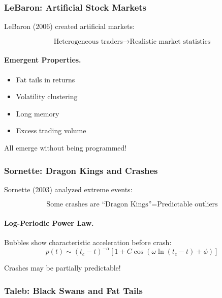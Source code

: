 \subsubsection{LeBaron: Artificial Stock Markets}

LeBaron (2006) created artificial markets:

\begin{equation}
\text{Heterogeneous traders} \to \text{Realistic market statistics}
\end{equation}

\paragraph{Emergent Properties.}
\begin{itemize}
    \item Fat tails in returns
    \item Volatility clustering
    \item Long memory
    \item Excess trading volume
\end{itemize}

All emerge without being programmed!

\subsubsection{Sornette: Dragon Kings and Crashes}

Sornette (2003) analyzed extreme events:

\begin{equation}
\boxed{
\text{Some crashes are ``Dragon Kings''} = \text{Predictable outliers}
}
\label{eq:sornette}
\end{equation}

\paragraph{Log-Periodic Power Law.}
Bubbles show characteristic acceleration before crash:
\begin{equation}
p(t) \sim (t_c - t)^{-\alpha} [1 + C \cos(\omega \ln(t_c - t) + \phi)]
\end{equation}

Crashes may be partially predictable!

\subsubsection{Taleb: Black Swans and Fat Tails}

